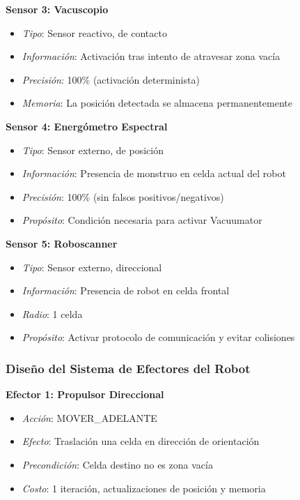\documentclass[10pt,twocolumn]{article}
\begin{document}
\textbf{Sensor 3: Vacuscopio}
\begin{itemize}
\item \textit{Tipo}: Sensor reactivo, de contacto
\item \textit{Información}: Activación tras intento de atravesar zona vacía
\item \textit{Precisión}: 100\% (activación determinista)
\item \textit{Memoria}: La posición detectada se almacena permanentemente
\end{itemize}

\textbf{Sensor 4: Energómetro Espectral}
\begin{itemize}
\item \textit{Tipo}: Sensor externo, de posición
\item \textit{Información}: Presencia de monstruo en celda actual del robot
\item \textit{Precisión}: 100\% (sin falsos positivos/negativos)
\item \textit{Propósito}: Condición necesaria para activar Vacuumator
\end{itemize}

\textbf{Sensor 5: Roboscanner}
\begin{itemize}
\item \textit{Tipo}: Sensor externo, direccional
\item \textit{Información}: Presencia de robot en celda frontal
\item \textit{Radio}: 1 celda
\item \textit{Propósito}: Activar protocolo de comunicación y evitar colisiones
\end{itemize}

\subsubsection{Diseño del Sistema de Efectores del Robot}

\textbf{Efector 1: Propulsor Direccional}
\begin{itemize}
\item \textit{Acción}: MOVER\_ADELANTE
\item \textit{Efecto}: Traslación una celda en dirección de orientación
\item \textit{Precondición}: Celda destino no es zona vacía
\item \textit{Costo}: 1 iteración, actualizaciones de posición y memoria
\end{itemize}
\end{document}
